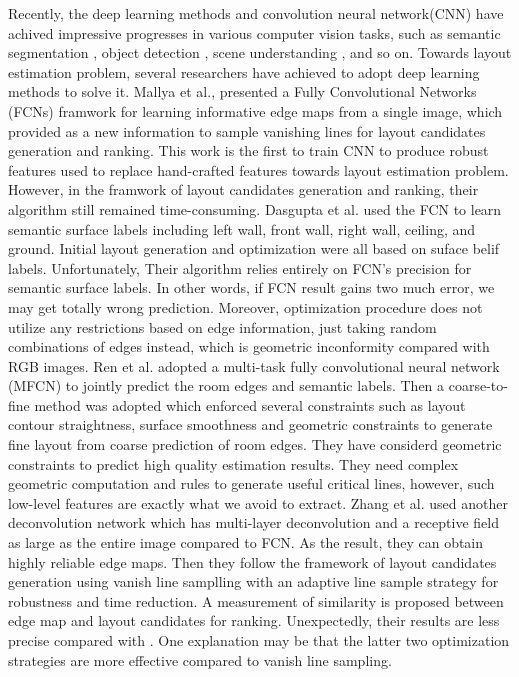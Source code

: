 Recently, the deep learning methods and convolution neural network(CNN) have achived impressive progresses in various computer vision tasks, such as semantic segmentation \cite{long2015fully}\cite{chen2016deeplab}, object detection \cite{girshick2015fast}\cite{ren2015faster}, scene understanding \cite{gupta2015indoor}\cite{badrinarayanan2017segnet}, and so on. Towards layout estimation problem, several researchers have achieved to adopt deep learning methods to solve it. Mallya et al.\cite{mallya2015learning}, presented a Fully Convolutional Networks (FCNs)\cite{long2015fully} framwork for learning informative edge maps from a single image, which provided as a new information to sample vanishing lines for layout candidates generation and ranking. This work is the first to train CNN to produce robust features used to replace hand-crafted features towards layout estimation problem. However, in the framwork of layout candidates generation and ranking, their algorithm still remained time-consuming. Dasgupta et al.\cite{dasgupta2016delay} used the FCN to learn semantic surface labels including left wall, front wall, right wall, ceiling, and ground. Initial layout generation and optimization were all based on suface belif labels. Unfortunately, Their algorithm relies entirely on FCN's precision for semantic surface labels. In other words, if FCN result gains two much error, we may get totally wrong prediction. Moreover, optimization procedure does not utilize any restrictions based on edge information, just taking random combinations of edges instead, which is geometric inconformity compared with RGB images. Ren et al.\cite{ren2016coarse} adopted a multi-task fully convolutional neural network (MFCN) to jointly predict the room edges and semantic labels. Then a coarse-to-fine method was adopted which enforced several constraints such as layout contour straightness, surface smoothness and geometric constraints to generate fine layout from coarse prediction of room edges. They have considerd geometric constraints to predict high quality estimation results. They need complex geometric computation and rules to generate useful critical lines, however, such low-level features are exactly what we avoid to extract. Zhang et al.\cite{zhang2016learning} used another deconvolution network which has multi-layer deconvolution and a receptive field as large as the entire image compared to FCN. As the result, they can obtain highly reliable edge maps. Then they follow the framework of layout candidates generation using vanish line samplling with an adaptive line sample strategy for robustness and time reduction. A measurement of similarity is proposed between edge map and layout candidates for ranking. Unexpectedly, their results are less precise compared with \cite{dasgupta2016delay}\cite{ren2016coarse}. One explanation may be that the latter two optimization strategies are more effective compared to vanish line sampling.


